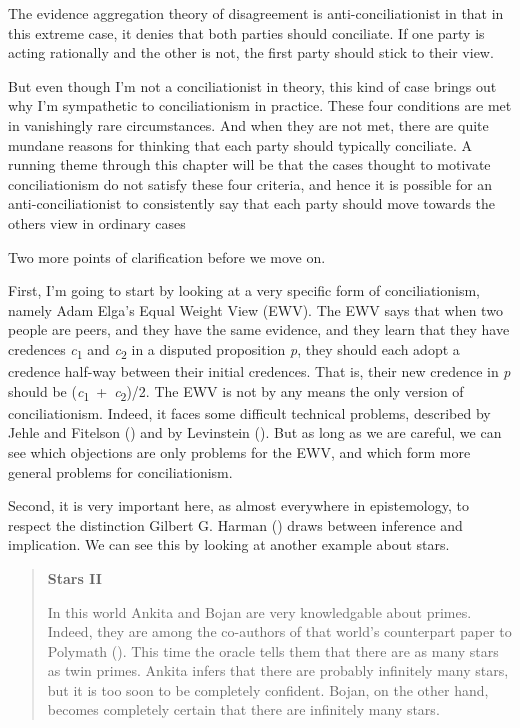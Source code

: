 \documentclass[
  10pt,
  letterpaper,
  twoside]{scrbook}
\begin{document}
The evidence aggregation theory of disagreement is anti-conciliationist
in that in this extreme case, it denies that both parties should
conciliate. If one party is acting rationally and the other is not, the
first party should stick to their view.

But even though I'm not a conciliationist in theory, this kind of case
brings out why I'm sympathetic to conciliationism in practice. These
four conditions are met in vanishingly rare circumstances. And when they
are not met, there are quite mundane reasons for thinking that each
party should typically conciliate. A running theme through this chapter
will be that the cases thought to motivate conciliationism do not
satisfy these four criteria, and hence it is possible for an
anti-conciliationist to consistently say that each party should move
towards the others view in ordinary cases

Two more points of clarification before we move on.

First, I'm going to start by looking at a very specific form of
conciliationism, namely Adam Elga's Equal Weight View (EWV). The EWV
says that when two people are peers, and they have the same evidence,
and they learn that they have credences \emph{c}\textsubscript{1} and
\emph{c}\textsubscript{2} in a disputed proposition \emph{p}, they
should each adopt a credence half-way between their initial credences.
That is, their new credence in \emph{p} should be
(\emph{c}\textsubscript{1}~+~\emph{c}\textsubscript{2})/2. The EWV is
not by any means the only version of conciliationism. Indeed, it faces
some difficult technical problems, described by Jehle and Fitelson
() and by Levinstein
(). But as long as we are careful, we
can see which objections are only problems for the EWV, and which form
more general problems for conciliationism.

Second, it is very important here, as almost everywhere in epistemology,
to respect the distinction Gilbert G. Harman
() draws between inference and
implication. We can see this by looking at another example about stars.

\begin{quote}
\textbf{Stars II}

In this world {Ankita} and {Bojan} are very knowledgable about primes.
Indeed, they are among the co-authors of that world's counterpart paper
to Polymath (). This time the oracle
tells them that there are as many stars as twin primes. {Ankita} infers
that there are probably infinitely many stars, but it is too soon to be
completely confident. {Bojan}, on the other hand, becomes completely
certain that there are infinitely many stars.
\end{quote}
\end{document}
